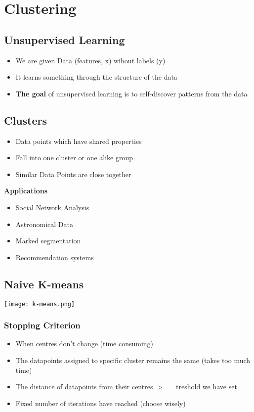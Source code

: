 \section{Clustering}
\subsection{Unsupervised Learning}
\begin{itemize}
    \item We are given Data (features, x) wihout labels (y)
    \item It learns something through the structure of the data
    \item \textbf{The goal} of unsupervised learning is to self-discover patterns from the data
\end{itemize}

\subsection{Clusters}
\begin{itemize}
    \item Data points which have shared properties
    \item Fall into one cluster or one alike group
    \item Similar Data Points are close together
\end{itemize}
\textbf{Applications}
\begin{itemize}
    \item Social Network Analysis
    \item Astronomical Data
    \item Marked segmentation
    \item Recommendation systems
\end{itemize}
\subsection{Naive K-means}
\texttt{[image: k-means.png]}

\subsubsection{Stopping Criterion}
\begin{itemize}
    \item When centres don't change (time consuming)
    \item The datapoints assigned to specific cluster remains the same (takes too much time)
    \item The distance of datapoints from their centres $>=$ treshold we have set
    \item Fixed number of iterations have reached (choose wisely)
\end{itemize}

